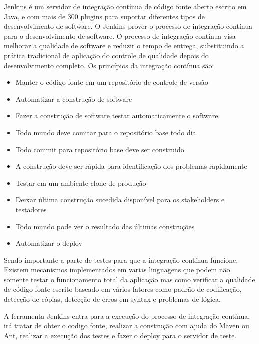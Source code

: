 \documentclass[12pt,a4paper]{article}
\begin{document}
			Jenkins é um servidor de integração contínua de código fonte aberto escrito em Java, e com mais de 300 plugins para
			suportar diferentes tipos de desenvolvimento de software. O Jenkins prover o processo de integração contínua para o
			desenvolvimento de software.
			O processo de integração contínua visa melhorar a qualidade de software e reduzir o tempo de entrega, substituindo a
			prática tradicional de aplicação do controle de qualidade depois do desenvolvimento completo. Os princípios da
			integração contínua são:
			\begin{itemize}
			  \item Manter o código fonte em um repositório de controle de versão
			  \item Automatizar a construção de software
			  \item Fazer a construção de software testar automaticamente o software
			  \item Todo mundo deve comitar para o repositório base todo dia
			  \item Todo commit para repositório base deve ser construido
			  \item A construção deve ser rápida para identificação dos problemas rapidamente
			  \item Testar em um ambiente clone de produção
			  \item Deixar última construção sucedida disponível para os stakeholders e testadores
			  \item Todo mundo pode ver o resultado das últimas construções
			  \item Automatizar o deploy
			\end{itemize}
			
			Sendo importante a parte de testes para que a integração contínua funcione. Existem mecanismos implementados em
			varias linguagens que podem não somente testar o funcionamento total da aplicação mas como verificar a qualidade de
			código fonte escrito baseado em vários fatores como padrão de codificação, detecção de cópias, detecção de erros em
			syntax e problemas de lógica.
			
			A ferramenta Jenkins entra para a execução do processo de integração contínua, irá tratar de obter o codigo fonte,
			realizar a construção com ajuda do Maven ou Ant, realizar a execução dos testes e fazer o deploy para o servidor de
			teste.
			
		
\end{document}
